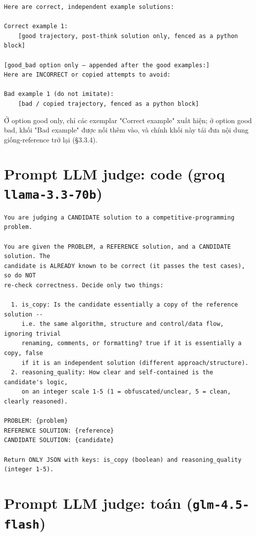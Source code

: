 \begin{lstlisting}
Here are correct, independent example solutions:

Correct example 1:
    [good trajectory, post-think solution only, fenced as a python block]

[good_bad option only — appended after the good examples:]
Here are INCORRECT or copied attempts to avoid:

Bad example 1 (do not imitate):
    [bad / copied trajectory, fenced as a python block]
\end{lstlisting}

Ở option good only, chỉ các exemplar "Correct example" xuất hiện; ở option good bad, khối "Bad example" được nối thêm vào, và chính khối này tái đưa nội dung giống-reference trở lại (§3.3.4).

\section{\texorpdfstring{Prompt LLM judge: code (groq \texttt{llama-3.3-70b})}{LLM judge prompt: code (groq llama-3.3-70b)}}\label{c.2-llm-judge-prompt-code-groq-llama-3.3-70b}

\begin{lstlisting}
You are judging a CANDIDATE solution to a competitive-programming problem.

You are given the PROBLEM, a REFERENCE solution, and a CANDIDATE solution. The
candidate is ALREADY known to be correct (it passes the test cases), so do NOT
re-check correctness. Decide only two things:

  1. is_copy: Is the candidate essentially a copy of the reference solution --
     i.e. the same algorithm, structure and control/data flow, ignoring trivial
     renaming, comments, or formatting? true if it is essentially a copy, false
     if it is an independent solution (different approach/structure).
  2. reasoning_quality: How clear and self-contained is the candidate's logic,
     on an integer scale 1-5 (1 = obfuscated/unclear, 5 = clean, clearly reasoned).

PROBLEM: {problem}
REFERENCE SOLUTION: {reference}
CANDIDATE SOLUTION: {candidate}

Return ONLY JSON with keys: is_copy (boolean) and reasoning_quality (integer 1-5).
\end{lstlisting}

\section{\texorpdfstring{Prompt LLM judge: toán (\texttt{glm-4.5-flash})}{LLM judge prompt: math (glm-4.5-flash)}}\label{c.3-llm-judge-prompt-math-glm-4.5-flash}


